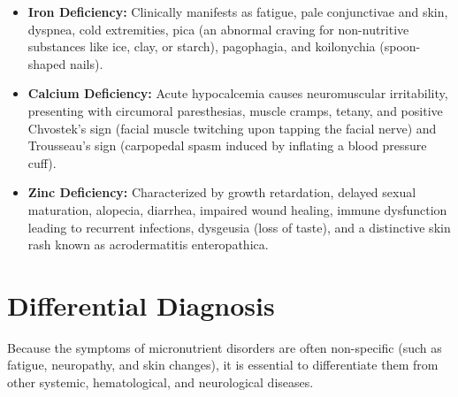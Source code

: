 \begin{itemize}
    \item \textbf{Iron Deficiency:} Clinically manifests as fatigue, pale conjunctivae and skin, dyspnea, cold extremities, pica (an abnormal craving for non-nutritive substances like ice, clay, or starch), pagophagia, and koilonychia (spoon-shaped nails).
    \item \textbf{Calcium Deficiency:} Acute hypocalcemia causes neuromuscular irritability, presenting with circumoral paresthesias, muscle cramps, tetany, and positive Chvostek's sign (facial muscle twitching upon tapping the facial nerve) and Trousseau's sign (carpopedal spasm induced by inflating a blood pressure cuff).
    \item \textbf{Zinc Deficiency:} Characterized by growth retardation, delayed sexual maturation, alopecia, diarrhea, impaired wound healing, immune dysfunction leading to recurrent infections, dysgeusia (loss of taste), and a distinctive skin rash known as acrodermatitis enteropathica.
\end{itemize}

\section*{Differential Diagnosis}
Because the symptoms of micronutrient disorders are often non-specific (such as fatigue, neuropathy, and skin changes), it is essential to differentiate them from other systemic, hematological, and neurological diseases.

